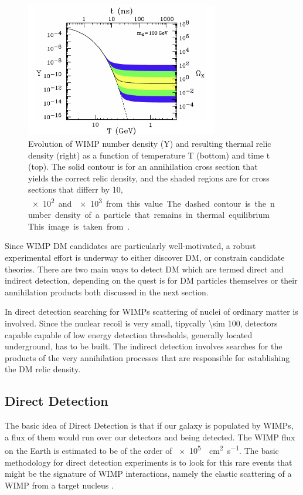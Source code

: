 \begin{figure}[pt]
\centering
\includegraphics[width=0.75\textwidth]{DarkMatter/Freezeout}
\caption{Evolution of WIMP number density (Y) and resulting thermal relic density (right) as a function of temperature T (bottom) and time
t (top). The solid contour is for an annihilation cross section that yields the correct relic density, and the shaded regions are for cross sections that differr by 10, \SI{e2} and \SI{e3} from this value. The dashed contour is the number density of a particle that remains in thermal equilibrium. This image is taken from \cite{feng:DM}.}
\label{fig:Freezeout}
\end{figure}

Since WIMP DM candidates are particularly well-motivated, a robust experimental effort is underway to either discover DM, or constrain candidate theories. There are two main ways to detect DM which are termed direct and indirect detection, depending on the quest is for DM particles themselves or their annihilation products both discussed in the next section. 

In direct detection searching for WIMPs scattering of nuclei of ordinary matter is involved. Since the nuclear recoil is very small, tipycally \SI{\sim 100}{\kev}, detectors capable capable of low energy detection thresholds, generally located underground, has to be built. The indirect detection involves searches for the products of the very annihilation processes that are responsible for establishing the DM relic density.

\subsection{Direct Detection}
The basic idea of Direct Detection is that if our galaxy is populated by WIMPs, a flux of them would run over our detectors and being detected. The WIMP flux on the Earth is estimated to be of the order of \SI{e5}{\per \cm\squared\per\s}. The basic methodology for direct detection experiments is to look for this rare events that might be the signature of WIMP interactions, namely the elastic scattering of a WIMP from a target nucleus \cite{snowmass}.

